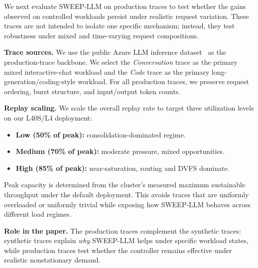 
We next evaluate SWEEP-LLM on production traces to test whether the gains observed on controlled workloads persist under realistic request variation.
These traces are not intended to isolate one specific mechanism; instead, they test robustness under mixed and time-varying request compositions.

\textbf{Trace sources.}
We use the public Azure LLM inference dataset~\cite{azure_llm_trace} as the production-trace backbone.
We select the \emph{Conversation} trace as the primary mixed interactive-chat workload and the \emph{Code} trace as the primary long-generation/coding-style workload.
For all production traces, we preserve request ordering, burst structure, and input/output token counts.

\textbf{Replay scaling.}
We scale the overall replay rate to target three utilization levels on our L40S/L4 deployment:
\begin{itemize}
    \item \textbf{Low (50\% of peak):} consolidation-dominated regime.
    \item \textbf{Medium (70\% of peak):} moderate pressure, mixed opportunities.
    \item \textbf{High (85\% of peak):} near-saturation, routing and DVFS dominate.
\end{itemize}
Peak capacity is determined from the cluster's measured maximum sustainable throughput under the default deployment.
This avoids traces that are uniformly overloaded or uniformly trivial while exposing how SWEEP-LLM behaves across different load regimes.

\textbf{Role in the paper.}
The production traces complement the synthetic traces: synthetic traces explain \emph{why} SWEEP-LLM helps under specific workload states, while production traces test whether the controller remains effective under realistic nonstationary demand.

